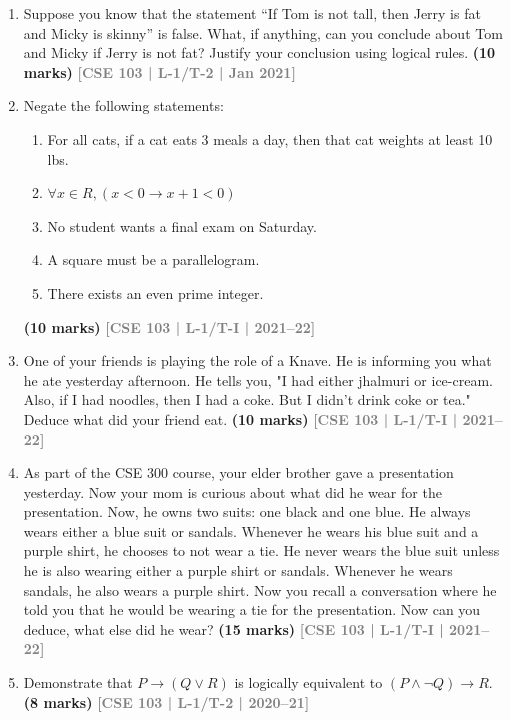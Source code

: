 \documentclass[12pt,a3paper]{article}
\newcommand{\yr}[1]{\hfill\textcolor{gray}{\small\textbf{[#1]}}}
\newcommand{\mk}[1]{\textcolor{orange!70!black}{\small\textbf{(#1 marks)}}}
\begin{document}
\begin{enumerate}
\item Suppose you know that the statement ``If Tom is not tall, then Jerry is fat and Micky is skinny'' is false. What, if anything, can you conclude about Tom and Micky if Jerry is not fat? Justify your conclusion using logical rules.
\mk{10} \yr{CSE 103 | L-1/T-2 | Jan 2021}



\item Negate the following statements:
\begin{enumerate}
    \item For all cats, if a cat eats 3 meals a day, then that cat weights at least 10 lbs.
    \item $\forall x \in R, (x < 0 \rightarrow x + 1 < 0)$
    \item No student wants a final exam on Saturday.
    \item A square must be a parallelogram.
    \item There exists an even prime integer.
\end{enumerate}
\mk{10} \yr{CSE 103 | L-1/T-I | 2021--22}

\item One of your friends is playing the role of a Knave. He is informing you what he ate yesterday afternoon. He tells you, "I had either jhalmuri or ice-cream. Also, if I had noodles, then I had a coke. But I didn't drink coke or tea." Deduce what did your friend eat.
\mk{10} \yr{CSE 103 | L-1/T-I | 2021--22}

\item As part of the CSE 300 course, your elder brother gave a presentation yesterday. Now your mom is curious about what did he wear for the presentation. Now, he owns two suits: one black and one blue. He always wears either a blue suit or sandals. Whenever he wears his blue suit and a purple shirt, he chooses to not wear a tie. He never wears the blue suit unless he is also wearing either a purple shirt or sandals. Whenever he wears sandals, he also wears a purple shirt. Now you recall a conversation where he told you that he would be wearing a tie for the presentation. Now can you deduce, what else did he wear?
\mk{15} \yr{CSE 103 | L-1/T-I | 2021--22}

\item Demonstrate that $P \to (Q \lor R)$ is logically equivalent to $(P \land \lnot Q) \to R$.
\mk{8} \yr{CSE 103 | L-1/T-2 | 2020--21}


\end{enumerate}
\end{document}
